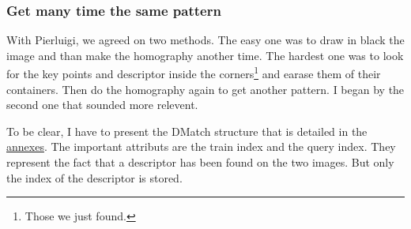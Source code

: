 	\subsubsection[Multiple pattern]{Get many time the same pattern}

	\par With Pierluigi, we agreed on two methods. The easy one was to draw in black the image and than make the homography another time. The hardest one was to look for the key points and descriptor inside the corners\footnote{Those we just found.} and earase them of their containers. Then do the homography again to get another pattern. I began by the second one that sounded more relevent. 
	
	\par To be clear, I have to present the DMatch structure that is detailed in the \hyperlink{structDMatch}{annexes}. The important attributs are the train index and the query index. They represent the fact that a descriptor has been found on the two images. But only the index of the descriptor is stored.
	
